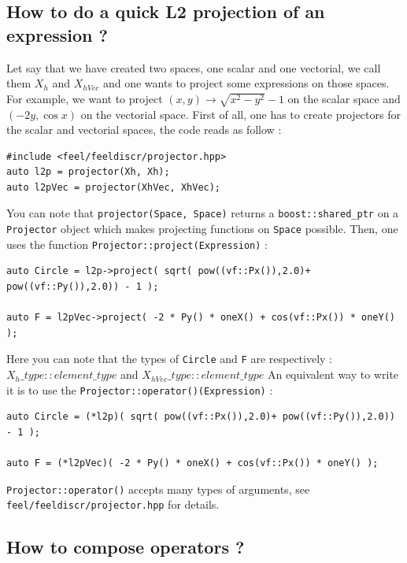 \subsection{How to do a quick L2 projection of an expression ?}
Let say that we have created two spaces, one scalar and one vectorial, we call them $\displaystyle{X_h}$ and $\displaystyle{X_{hVec}}$ and one wants to project some expressions on those spaces. \newline \newline
For example, we want to project $\displaystyle{(x,y) \rightarrow \sqrt{x^2 - y^2} -1}$ on the scalar space and $\displaystyle{(-2y, \cos{x})}$ on the vectorial space.
First of all, one has to create projectors for the scalar and vectorial spaces, the code reads as follow :
\begin{lstlisting}
#include <feel/feeldiscr/projector.hpp>
auto l2p = projector(Xh, Xh);
auto l2pVec = projector(XhVec, XhVec);
\end{lstlisting}
You can note that \lstinline!projector(Space, Space)! returns a \lstinline!boost::shared_ptr! on a \lstinline!Projector! object which makes projecting functions on \lstinline!Space! possible.
\newline \newline
Then, one uses the function \lstinline!Projector::project(Expression)! :
\begin{lstlisting}
auto Circle = l2p->project( sqrt( pow((vf::Px()),2.0)+ pow((vf::Py()),2.0)) - 1 );

auto F = l2pVec->project( -2 * Py() * oneX() + cos(vf::Px()) * oneY() );
\end{lstlisting}
Here you can note that the types of \lstinline!Circle! and \lstinline!F! are respectively : $X_{h}\_type::element\_type$ and $X_{hVec}\_type::element\_type$
\newline
An equivalent way to write it is to use the \lstinline!Projector::operator()(Expression)! :
\begin{lstlisting}
auto Circle = (*l2p)( sqrt( pow((vf::Px()),2.0)+ pow((vf::Py()),2.0)) - 1 );

auto F = (*l2pVec)( -2 * Py() * oneX() + cos(vf::Px()) * oneY() );
\end{lstlisting}
\lstinline!Projector::operator()! accepts many types of arguments, see \lstinline!feel/feeldiscr/projector.hpp! for details.



\subsection{How to compose \feel operators ?}


